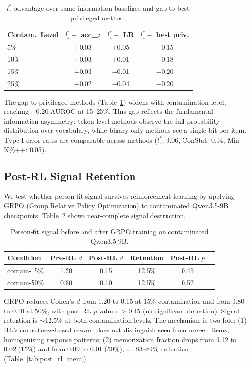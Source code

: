 \documentclass[11pt]{article}
\begin{document}
\begin{table}[h]
\centering
\caption{$l_z^*$ advantage over same-information baselines and gap to best privileged method.}
\label{tab:baseline_advantage}
\begin{tabular}{lccc}
\toprule
Contam.\ Level & $l_z^* - $ acc\_$z$ & $l_z^* - $ LR & $l_z^* - $ best priv. \\
\midrule
5\% & +0.03 & +0.05 & $-$0.15 \\
10\% & +0.03 & +0.01 & $-$0.18 \\
15\% & +0.03 & $-$0.01 & $-$0.20 \\
25\% & +0.02 & $-$0.04 & $-$0.20 \\
\bottomrule
\end{tabular}
\end{table}

The gap to privileged methods (Table~\ref{tab:baseline_advantage}) widens with contamination level, reaching $-$0.20 AUROC at 15--25\%. This gap reflects the fundamental information asymmetry: token-level methods observe the full probability distribution over vocabulary, while binary-only methods see a single bit per item. Type-I error rates are comparable across methods ($l_z^*$: 0.06, ConStat: 0.04, Min-K\%++: 0.05).

\subsection{Post-RL Signal Retention}
\label{sec:post_rl}

We test whether person-fit signal survives reinforcement learning by applying GRPO (Group Relative Policy Optimization) to contaminated Qwen3.5-9B checkpoints. Table~\ref{tab:post_rl} shows near-complete signal destruction.

\begin{table}[h]
\centering
\caption{Person-fit signal before and after GRPO training on contaminated Qwen3.5-9B.}
\label{tab:post_rl}
\begin{tabular}{lccccc}
\toprule
Condition & Pre-RL $d$ & Post-RL $d$ & Retention & Post-RL $p$ \\
\midrule
contam-15\% & 1.20 & 0.15 & 12.5\% & 0.45 \\
contam-50\% & 0.80 & 0.10 & 12.5\% & 0.52 \\
\bottomrule
\end{tabular}
\end{table}

GRPO reduces Cohen's $d$ from 1.20 to 0.15 at 15\% contamination and from 0.80 to 0.10 at 50\%, with post-RL $p$-values $> 0.45$ (no significant detection). Signal retention is $\sim$12.5\% at both contamination levels. The mechanism is two-fold: (1) RL's correctness-based reward does not distinguish seen from unseen items, homogenizing response patterns; (2) memorization fraction drops from 0.12 to 0.02 (15\%) and from 0.09 to 0.01 (50\%), an 83--89\% reduction (Table~\ref{tab:post_rl_mem}).
\end{document}

